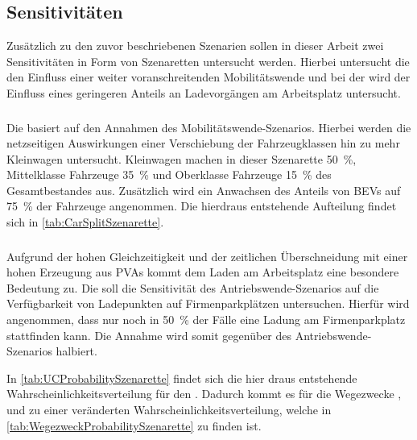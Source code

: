 


\subsection{Sensitivitäten}

Zusätzlich zu den zuvor beschriebenen Szenarien sollen in dieser Arbeit zwei Sensitivitäten in Form von Szenaretten untersucht werden.
Hierbei untersucht die \Kleinwagen den Einfluss einer weiter voranschreitenden Mobilitätswende und bei der \SzeFirmenparkplatz wird der Einfluss eines geringeren Anteils an Ladevorgängen am Arbeitsplatz untersucht.


\subsubsection{\Kleinwagendot}

Die \Kleinwagen basiert auf den Annahmen des Mobilitätswende-Szenarios.
Hierbei werden die netzseitigen Auswirkungen einer Verschiebung der Fahrzeugklassen hin zu mehr Kleinwagen untersucht.
Kleinwagen machen in dieser Szenarette \SI{50}{\percent}, Mittelklasse Fahrzeuge \SI{35}{\percent} und Oberklasse Fahrzeuge \SI{15}{\percent} des Gesamtbestandes aus.
Zusätzlich wird ein Anwachsen des Anteils von \glspl{BEV} auf \SI{75}{\percent} der Fahrzeuge angenommen.
Die hierdraus entstehende Aufteilung findet sich in \autoref{tab:CarSplitSzenarette}.




\subsubsection{\SzeFirmenparkplatzdot}

Aufgrund der hohen Gleichzeitigkeit und der zeitlichen Überschneidung mit einer hohen Erzeugung aus \glspl{PVA} kommt dem Laden am Arbeitsplatz eine besondere Bedeutung zu.
Die \SzeFirmenparkplatz soll die Sensitivität des Antriebswende-Szenarios auf die Verfügbarkeit von Ladepunkten auf Firmenparkplätzen untersuchen.
Hierfür wird angenommen, dass nur noch in \SI{50}{\percent} der Fälle eine Ladung am Firmenparkplatz stattfinden kann.
Die Annahme wird somit gegenüber des Antriebswende-Szenarios halbiert.



In \autoref{tab:UCProbabilitySzenarette} findet sich die hier draus entstehende Wahrscheinlichkeitsverteilung für den \UC \Firmeparkplatzdot.
Dadurch kommt es für die Wegezwecke \Arbeitdot, \dienst und \Ausbildung zu einer veränderten Wahrscheinlichkeitsverteilung, welche in \autoref{tab:WegezweckProbabilitySzenarette} zu finden ist.


